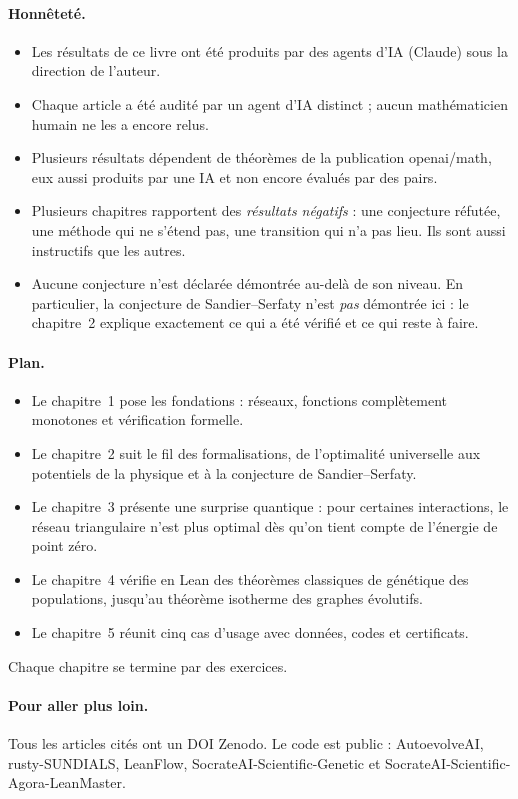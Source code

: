 \paragraph{Honnêteté.}
\begin{itemize}
\item Les résultats de ce livre ont été produits par des agents d'IA (Claude) sous la direction de l'auteur.
\item Chaque article a été audité par un agent d'IA distinct ; aucun mathématicien humain ne les a encore relus.
\item Plusieurs résultats dépendent de théorèmes de la publication openai/math, eux aussi produits par une IA et non
encore évalués par des pairs.
\item Plusieurs chapitres rapportent des \emph{résultats négatifs} : une conjecture réfutée, une méthode qui ne s'étend
pas, une transition qui n'a pas lieu. Ils sont aussi instructifs que les autres.
\item Aucune conjecture n'est déclarée démontrée au-delà de son niveau. En particulier, la conjecture de
Sandier--Serfaty n'est \emph{pas} démontrée ici : le chapitre~2 explique exactement ce qui a été vérifié et ce qui
reste à faire.
\end{itemize}

\paragraph{Plan.}
\begin{itemize}
\item Le chapitre~1 pose les fondations : réseaux, fonctions complètement monotones et vérification formelle.
\item Le chapitre~2 suit le fil des formalisations, de l'optimalité universelle aux potentiels de la physique et à la
conjecture de Sandier--Serfaty.
\item Le chapitre~3 présente une surprise quantique : pour certaines interactions, le réseau triangulaire n'est plus
optimal dès qu'on tient compte de l'énergie de point zéro.
\item Le chapitre~4 vérifie en Lean des théorèmes classiques de génétique des populations, jusqu'au théorème
isotherme des graphes évolutifs.
\item Le chapitre~5 réunit cinq cas d'usage avec données, codes et certificats.
\end{itemize}
Chaque chapitre se termine par des exercices.

\paragraph{Pour aller plus loin.} Tous les articles cités ont un DOI Zenodo. Le code est public : AutoevolveAI,
rusty-SUNDIALS, LeanFlow, SocrateAI-Scientific-Genetic et SocrateAI-Scientific-Agora-LeanMaster.
